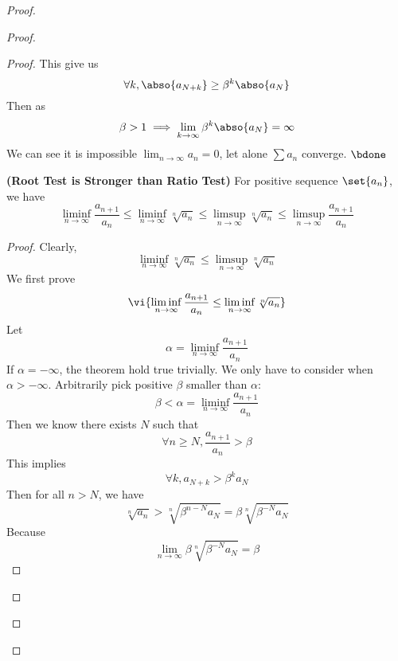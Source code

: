 \documentclass{report}
\begin{document}
\begin{proof}
\begin{proof}
\begin{proof}
This give us
\begin{equation}
\forall k, \abso{a_{N+k}}\geq \beta^k \abso{a_N}
\end{equation}
Then as 
\begin{equation}
\beta >1\implies \lim_{k\to\infty}\beta ^k\abso{a_N}=\infty
\end{equation}
We can see it is impossible $\lim_{n\to\infty}a_n=0$, let alone $\sum a_n$ converge. $\bdone$
\begin{theorem}
\label{4.6.3}
\textbf{(Root Test is Stronger than Ratio Test)} For positive sequence $\set{a_n}$, we have
\begin{equation}
\liminf_{n\to\infty}\frac{a_{n+1}}{a_n}\leq \liminf_{n\to\infty} \sqrt[n]{a_n} \leq \limsup_{n\to\infty} \sqrt[n]{a_n} \leq \limsup_{n\to\infty} \frac{a_{n+1}}{a_n}
\end{equation}
\end{theorem}
\begin{proof}
Clearly, 
\begin{equation}
\liminf_{n\to\infty} \sqrt[n]{a_n}\leq \limsup_{n\to\infty} \sqrt[n]{a_n}  
\end{equation}
We first prove
\begin{equation}
  \vi{\liminf_{n\to\infty} \frac{a_{n+1}}{a_n}\leq \liminf_{n\to\infty} \sqrt[n]{a_n}}
\end{equation}
Let 
\begin{equation}
\alpha =\liminf_{n\to\infty} \frac{a_{n+1}}{a_n}
\end{equation}
If $\alpha =-\infty$, the theorem hold true trivially. We only have to consider when $\alpha >-\infty$. Arbitrarily pick positive $\beta $ smaller than $\alpha $:
\begin{equation}
\beta <\alpha=\liminf_{n\to\infty} \frac{a_{n+1}}{a_n}
\end{equation}
Then we know there exists $N$ such that
 \begin{equation}
\forall n\geq N, \frac{a_{n+1}}{a_n}>\beta 
\end{equation}
This implies 
\begin{equation}
\forall k, a_{N+k}>\beta^k a_N
\end{equation}
Then for all $n>N$, we have
 \begin{equation}
   \sqrt[n]{a_n}>\sqrt[n]{ \beta^{n-N}a_{N}}=\beta \sqrt[n]{\beta^{-N}a_N} 
\end{equation}
Because 
\begin{equation}
\lim_{n\to\infty}\beta \sqrt[n]{\beta^{-N}a_N}=\beta 
\end{equation}

\end{proof}
\end{proof}
\end{proof}
\end{proof}
\end{document}
